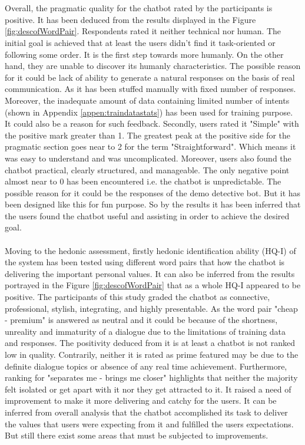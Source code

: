 \\~\\
Overall, the pragmatic quality for the chatbot rated by the participants is positive. It has been deduced from the results displayed in the Figure \ref{fig:descofWordPair}. Respondents rated it neither technical nor human. The initial goal is achieved that at least the users didn't find it task-oriented or following some order. It is the first step towards more humanly. On the other hand, they are unable to discover its humanly characteristics. The possible reason for it could be lack of ability to generate a natural responses on the basis of real communication. As it has been stuffed manually with fixed number of responses. Moreover, the inadequate amount of data containing limited number of intents (shown in Appendix \ref{appen:traindatastats}) has been used for training purpose. It could also be a reason for such feedback. Secondly, users rated it "Simple" with the positive mark greater than 1. The greatest peak at the positive side for the pragmatic section goes near to 2 for the term "Straightforward". Which means it was easy to understand and was uncomplicated. Moreover, users also found the chatbot practical, clearly structured, and manageable. The only negative point almost near to 0 has been encountered i.e. the chatbot is unpredictable. The possible reason for it could be the responses of the demo detective bot. But it has been designed like this for fun purpose. So by the results it has been inferred that the users found the chatbot useful and assisting in order to achieve the desired goal.
\\~\\
Moving to the hedonic assessment, firstly hedonic identification ability (HQ-I) of the system has been tested using different word pairs that how the chatbot is delivering the important personal values. It can also be inferred from the results portrayed in the Figure \ref{fig:descofWordPair} that as a whole HQ-I appeared to be positive. The participants of this study graded the chatbot as connective, professional, stylish, integrating, and highly presentable. As the word pair "cheap - premium" is answered as neutral and it could be because of the shortness, unreality and immaturity of a dialogue due to the limitations of training data and responses. The positivity deduced from it is at least a chatbot is not ranked low in quality. Contrarily, neither it is rated as prime featured may be due to the definite dialogue topics or absence of any real time achievement. Furthermore, ranking for "separates me - brings me closer" highlights that neither the majority felt isolated or get apart with it nor they get attracted to it. It raised a need of improvement to make it more delivering and catchy for the users. It can be inferred from overall analysis that the chatbot accomplished its task to deliver the values that users were expecting from it and fulfilled the users expectations. But still there exist some areas that must be subjected to improvements.
